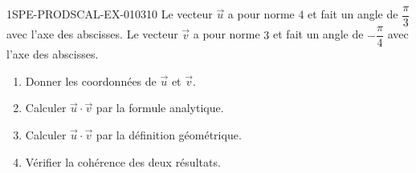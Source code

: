 \begin{exercice}{1SPE-PRODSCAL-EX-010}{3}{10}
Le vecteur $\vec{u}$ a pour norme $4$ et fait un angle de $\dfrac{\pi}{3}$ avec l'axe des abscisses. Le vecteur $\vec{v}$ a pour norme $3$ et fait un angle de $-\dfrac{\pi}{4}$ avec l'axe des abscisses.
\begin{enumerate}
  \item Donner les coordonnées de $\vec{u}$ et $\vec{v}$.
  \item Calculer $\vec{u} \cdot \vec{v}$ par la formule analytique.
  \item Calculer $\vec{u} \cdot \vec{v}$ par la définition géométrique.
  \item Vérifier la cohérence des deux résultats.
\end{enumerate}
\end{exercice}
